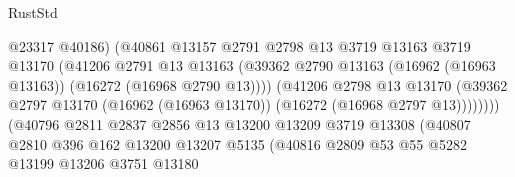 \begin{lexlean}{RustStd}
\begin{coremodule}
                                          @23317
                                          @40186)
                                        (@40861
                                          @13157
                                          @2791
                                          @2798
                                          @13
                                          @3719
                                          @13163
                                          @3719
                                          @13170
                                          (@41206
                                            @2791
                                            @13
                                            @13163
                                            (@39362
                                              @2790
                                              @13163
                                              (@16962 (@16963 @13163))
                                              (@16272 (@16968 @2790 @13))))
                                          (@41206
                                            @2798
                                            @13
                                            @13170
                                            (@39362
                                              @2797
                                              @13170
                                              (@16962 (@16963 @13170))
                                              (@16272 (@16968 @2797 @13))))))))
                                  (@40796
                                    @2811
                                    @2837
                                    @2856
                                    @13
                                    @13200
                                    @13209
                                    @3719
                                    @13308
                                    (@40807
                                      @2810
                                      @396
                                      @162
                                      @13200
                                      @13207
                                      @5135
                                      (@40816
                                        @2809
                                        @53
                                        @55
                                        @5282
                                        @13199
                                        @13206
                                        @3751
                                        @13180

\end{coremodule}
\end{lexlean}
